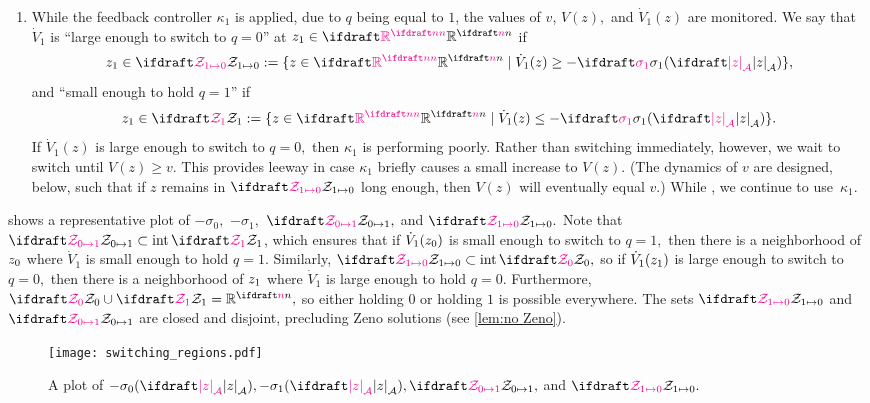 {\begin{enumerate}
    \item While the feedback controller $\kappa_1$ is applied, 
    due to $q$ being equal to $1$, 
    the values of $v$, $V(z),$ and $\dot V_1(z)$ are monitored.
    We say that $\dot V_1$ is ``large enough to switch to $q=0$'' 
    at $\zone \in \plantstatespace$ if
    \begin{equation}
        \zone\in \calZswitchtozero 
        := \{z \in \plantstatespace \mid \dot V_1(z) \geq -\sigmaone(\distA{z})\},
        \label{eq:Zswitchtozero}
    \end{equation} 
    and ``small enough to hold $q=1$'' if
    \begin{equation}
        \zone\in\calZholdone  
        := \{z \in \plantstatespace \mid \dot V_1(z) \leq -\sigmaone(\distA{z})\}.
        \label{eq:Zholdone}
    \end{equation}
    If $\dot V_1(z)$ is large enough to switch to $q=0,$
    then $\kappa_1$ is performing poorly. 
    Rather than switching immediately, however, we wait to switch 
    until ${V(z) \geq v}.$ This provides leeway
    in case $\kappa_1$ briefly causes a small increase to $V(z)$. 
    (The dynamics of $v$ are designed, below, 
    such that if $z$ remains in $\calZswitchtozero$ long enough, 
    then $V(z)$ will eventually equal $v$.) 
    While , 
     we continue to use~$\kappa_1$.%
    \label{item:q=1 switching criterion}
\end{enumerate}
}
 shows a representative plot of 
$-\sigma_0,$ $-\sigma_1,$ $\calZswitchtoone,$ and $\calZswitchtozero.$ 
Note that $\calZswitchtoone \subset \interior \calZholdone$,
which ensures that if $\dot V_1(z_0)$ is small enough to switch to $q=1,$
then there is a neighborhood of 
$z_0$ where $\dot V_1$ is small enough to hold $q = 1$.
Similarly, $\calZswitchtozero \subset \interior \calZholdzero,$ so
if $\dot V_1(z_1)$ is large enough to switch to $q = 0,$
then there is a neighborhood of
$z_1$ where $\dot V_1$ is large enough to hold $q = 0$.
Furthermore, 
$\calZholdzero \union \calZholdone = \reals^\nplant,$
so either holding $0$ or holding $1$ is possible everywhere. The 
sets $\calZswitchtozero$ and $\calZswitchtoone$ are closed and disjoint,
precluding Zeno solutions (see \cref{lem:no Zeno}).
\begin{figure}[ht]
    \centering
    \texttt{[image: switching\_regions.pdf]}
    \setlength{\belowcaptionskip}{-6pt}
    \caption{A plot of $-\sigma_0(\distA{z}), -\sigma_1(\distA{z}),
    \calZswitchtoone,$ and $\calZswitchtozero.$}
    \label{fig:switching regions}
\end{figure}


